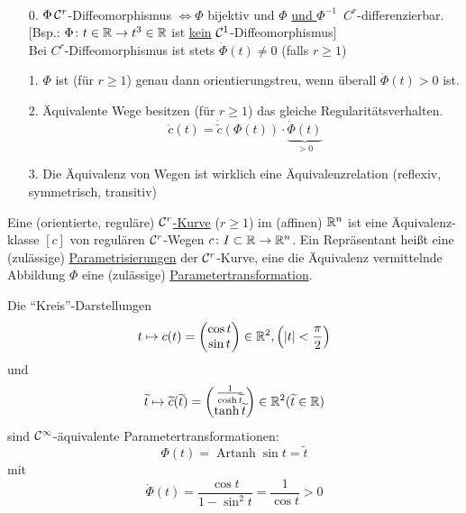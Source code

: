 \begin{bemerkung} \(\)
 \begin{enumerate}
  \item[0.] \(\Phi \, \mathcal{C}^r\)-Diffeomorphismus \(\Leftrightarrow \Phi\) bijektiv und \(\Phi\) \uline{und \(\Phi^{-1}\)}\, \(C^r\)-differenzierbar. 
  [Bsp.: \(\Phi \colon t \in \mathbb{R} \to t^3 \in \mathbb{R}\) ist \uline{kein} \(\mathcal{C}^1\)-Diffeomorphismus] \\
  Bei \(C^r\)-Diffeomorphismus ist stets \(\dot \Phi(t)\ne 0\) (falls \(r\ge 1\))
  \item[1.] \(\Phi\) ist (für \(r\ge 1\)) genau dann orientierungstreu, wenn überall \(\dot \Phi(t)>0\) ist.
  \item[2.] Äquivalente Wege besitzen (für \(r\ge 1\)) das gleiche Regularitätsverhalten.
  \[
   \dot c(t)= \dot{\widetilde c} (\Phi(t)) \cdot \underbrace{\dot \Phi(t)}_{>0}
  \]
  \item[3.] Die Äquivalenz von Wegen ist wirklich eine Äquivalenzrelation (reflexiv, symmetrisch, transitiv)
 \end{enumerate}
\end{bemerkung}

\begin{definition}
 Eine (orientierte, reguläre) \uline{\(\mathcal{C}^r\)-Kurve} (\(r\ge1\)) im (affinen) \(\mathbb{R}^n\) ist eine Äquivalenz-klasse \([c]\) von regulären \(\mathcal{C}^r\)-Wegen \(c \colon I \subset \mathbb{R} \to \mathbb{R}^n\). Ein Repräsentant heißt eine (zulässige) \uline{Parametrisierungen} der \(\mathcal{C}^r\)-Kurve, eine die Äquivalenz vermittelnde Abbildung \(\Phi\) eine (zulässige) \uline{Parametertransformation}.
\end{definition}

\begin{bsp}
 Die "`Kreis"'-Darstellungen 
 \[
 t \mapsto c(t)=\begin{pmatrix}
                 \cos t \\
                 \sin t
                \end{pmatrix} \in \mathbb{R}^2, \left(|t|<\frac\pi2\right)
 \]
 und 
     \[
      \widetilde t\mapsto \widetilde c(\widetilde t) = \begin{pmatrix}
                                             \frac1{\cosh \widetilde t} \\
                                             \tanh \widetilde t
                                            \end{pmatrix} \in \mathbb{R}^2 (\widetilde t \in \mathbb{R}) 
     \]
 sind \(\mathcal{C}^\infty\)-äquivalente Parametertransformationen: \[
                                                            \Phi(t) = \operatorname{Artanh} \sin t = \widetilde t
                                                           \]
mit
\[
 \dot \Phi(t)=\frac{\cos t}{1-\sin^2 t}= \frac1{\cos t} >0
\]
\end{bsp}

